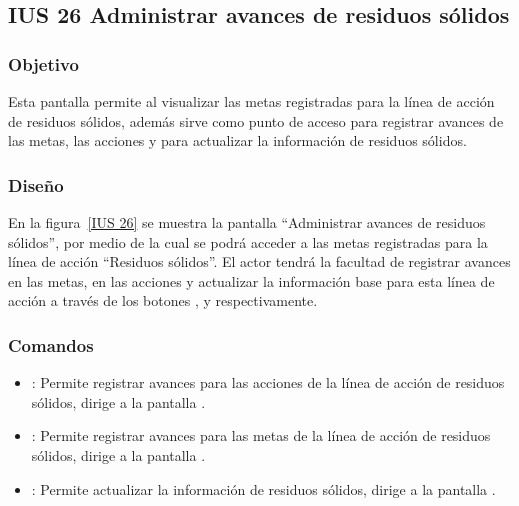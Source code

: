 \subsection{IUS 26 Administrar avances de residuos sólidos}

\subsubsection{Objetivo}

    Esta pantalla permite al  visualizar las metas registradas para la línea de acción de residuos sólidos, además sirve como punto de acceso para registrar avances de las metas, las acciones y para actualizar la información de residuos sólidos. 
    
\subsubsection{Diseño}

        En la figura~\ref{IUS 26} se muestra la pantalla ``Administrar avances de residuos sólidos'', por medio de la cual se podrá acceder a las metas registradas para la línea de acción ``Residuos sólidos''. El actor tendrá la facultad de registrar avances en las metas, en las acciones y actualizar la información base para esta línea de acción a través de los botones \botAcciones, \botMetas y  respectivamente.  




\subsubsection{Comandos}
    \begin{itemize}
	\item {}: Permite registrar avances para las acciones de la línea de acción de residuos sólidos, dirige a la pantalla .	
	\item {}: Permite registrar avances para las metas de la línea de acción de residuos sólidos, dirige a la pantalla .	
	\item {}: Permite actualizar la información de residuos sólidos, dirige a la pantalla .
    \end{itemize}

